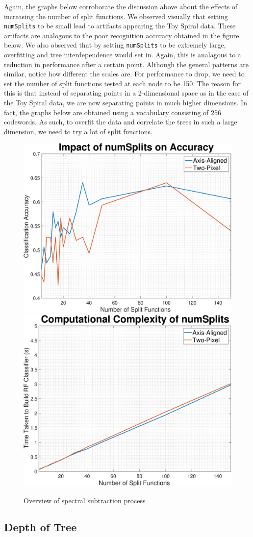 \documentclass[a4paper,pra,twocolumn,10pt,aps,longbibliography,nobalancelastpage]{revtex4-1}
\begin{document}
Again, the graphs below corroborate the discussion above about the effects of increasing the number of split functions. We observed visually that setting \texttt{numSplits} to be small lead to artifacts appearing the Toy Spiral data. These artifacts are analogous to the poor recognition accuracy obtained in the figure below. We also observed that by setting \texttt{numSplits} to be extremely large, overfitting and tree interdependence would set in. Again, this is analagous to a reduction in performance after a certain point. Although the general patterns are similar, notice how different the scales are. For performance to drop, we need to set the number of split functions tested at each node to be 150. The reason for this is that instead of separating points in a 2-dimensional space as in the case of the Toy Spiral data, we are now separating points in much higher dimensions. In fact, the graphs below are obtained using a vocabulary consisting of 256 codewords. As such, to overfit the data and correlate the trees in such a large dimension, we need to try a lot of split functions. 

\begin{figure}[H]
	\centering
    \includegraphics[width=0.49\columnwidth]{numSplits_acc}
	\includegraphics[width=0.49\columnwidth]{numSplits_complexity}
    \caption{Overview of spectral subtraction process}
\end{figure}

\subsection*{Depth of Tree}
\end{document}
